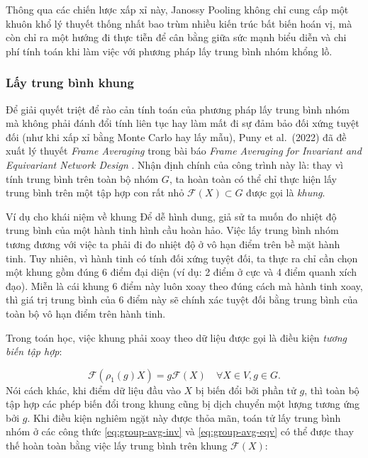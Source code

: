 Thông qua các chiến lược xấp xỉ này, Janossy Pooling không chỉ cung cấp một khuôn khổ lý thuyết thống nhất bao trùm nhiều kiến trúc bất biến hoán vị, mà còn chỉ ra một hướng đi thực tiễn để cân bằng giữa sức mạnh biểu diễn và chi phí tính toán khi làm việc với phương pháp lấy trung bình nhóm khổng lồ.

\subsubsection{Lấy trung bình khung}
\label{subsubsec:frame-averaging}

Để giải quyết triệt để rào cản tính toán của phương pháp lấy trung bình nhóm mà không phải đánh đổi tính liên tục hay làm mất đi sự đảm bảo đối xứng tuyệt đối (như khi xấp xỉ bằng Monte Carlo hay lấy mẫu), Puny et al.\ (2022) đã đề xuất lý thuyết \textit{Frame Averaging} trong bài báo \textit{Frame Averaging for Invariant and Equivariant Network Design} \cite{puny2022frame}. Nhận định chính của công trình này là: thay vì tính trung bình trên toàn bộ nhóm $G$, ta hoàn toàn có thể chỉ thực hiện lấy trung bình trên một tập hợp con rất nhỏ $\mathcal{F}(X) \subset G$ được gọi là \textit{khung}. 

\begin{examplebox}{Ví dụ cho khái niệm về khung}
Để dễ hình dung, giả sử ta muốn đo nhiệt độ trung bình của một hành tinh hình cầu hoàn hảo. Việc lấy trung bình nhóm tương đương với việc ta phải đi đo nhiệt độ ở vô hạn điểm trên bề mặt hành tinh. Tuy nhiên, vì hành tinh có tính đối xứng tuyệt đối, ta thực ra chỉ cần chọn một khung gồm đúng 6 điểm đại diện (ví dụ: 2 điểm ở cực và 4 điểm quanh xích đạo). Miễn là cái khung 6 điểm này luôn xoay theo đúng cách mà hành tinh xoay, thì giá trị trung bình của 6 điểm này sẽ chính xác tuyệt đối bằng trung bình của toàn bộ vô hạn điểm trên hành tinh. 
\end{examplebox}

Trong toán học, việc khung phải xoay theo dữ liệu được gọi là điều kiện \textit{tương biến tập hợp}:

\begin{equation}
    \mathcal{F}(\rho_1(g)X) = g\mathcal{F}(X) \quad \forall X \in V, g \in G.
\end{equation}
Nói cách khác, khi điểm dữ liệu đầu vào $X$ bị biến đổi bởi phần tử $g$, thì toàn bộ tập hợp các phép biến đổi trong khung cũng bị dịch chuyển một lượng tương ứng bởi $g$. Khi điều kiện nghiêm ngặt này được thỏa mãn, toán tử lấy trung bình nhóm ở các công thức \eqref{eq:group-avg-inv} và \eqref{eq:group-avg-eqv} có thể được thay thế hoàn toàn bằng việc lấy trung bình trên khung $\mathcal{F}(X)$:

